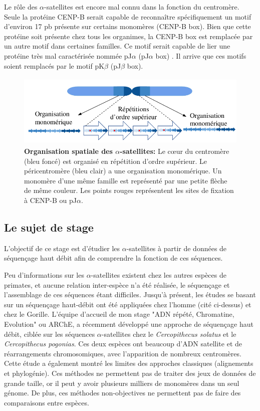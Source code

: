 \documentclass[12pt,a4paper]{article}
\begin{document}
Le rôle des $\alpha$-satellites est encore mal connu dans la fonction du centromère. Seule la protéine CENP-B serait capable de reconnaître spécifiquement un motif d'environ 17 pb présente sur certains monomères (CENP-B box). Bien que cette protéine soit présente chez tous les organimes, la CENP-B box est remplacée par un autre motif dans certaines familles. Ce motif serait capable de lier une protéine très mal caractérisée nommée pJ$\alpha$ (pJ$\alpha$ box) \cite{Romanova1996}. Il arrive que ces motifs soient remplacés par le motif pK$\beta$ (pJ$\beta$ box).  

\begin{figure}
	\center
		\includegraphics[height=3.5cm, width=12cm]{img/AS_organization.png}
		\caption{\textbf{Organisation spatiale des $\alpha$-satellites:} Le cœur du centromère (bleu foncé) est organisé en répétition d'ordre supérieur. Le péricentromère (bleu clair) a une organisation monomérique. Un monomère d'une même famille est représenté par une petite flèche de même couleur. Les points rouges représentent les sites de fixation à CENP-B ou pJ$\alpha$. \label{organisation_spatiale}}
\end{figure}

\subsection{Le sujet de stage}

L'objectif de ce stage est d'étudier les $\alpha$-satellites à partir de données de séquençage haut débit afin de comprendre la fonction de ces séquences. 

Peu d'informations sur les $\alpha$-satellites existent chez les autres espèces de primates, et aucune relation inter-espèce n'a été réalisée, le séquençage et l'assemblage de ces séquences étant difficiles. Jusqu'à présent, les études se basant sur un séquençage haut-débit ont été appliquées chez l'homme (cité ci-dessus) et chez le Gorille. L'équipe d'accueil de mon stage "ADN répété, Chromatine, Evolution" ou ARChE, a récemment développé une approche de séquençage haut débit, ciblée sur les séquences $\alpha$-satellites chez le \textit{Cercopithecus solatus} et le \textit{Cercopithecus pogonias}. Ces deux espèces ont beaucoup d'ADN satellite et de réarrangements chromosomiques, avec l'apparition de nombreux centromères. Cette étude a également montré les limites des approches classiques (alignements et phylogénie). Ces méthodes ne permettent pas de traiter des jeux de données de grande taille, or il peut y avoir plusieurs milliers de  monomères dans un seul génome. De plus, ces méthodes non-objectives ne permettent pas de faire des comparaisons entre espèces.
\end{document}

